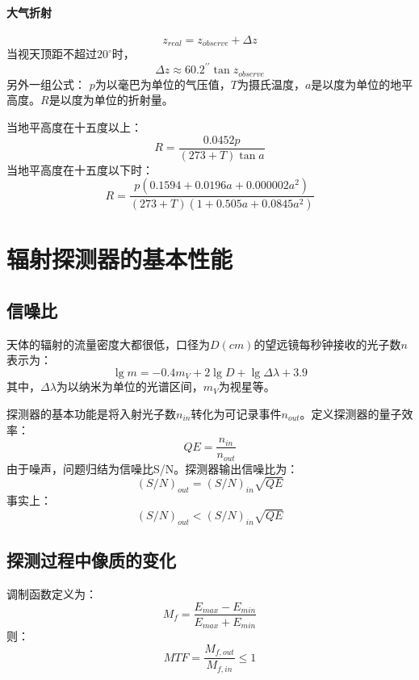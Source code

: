 \paragraph{大气折射}
\begin{equation}
	z_{real}=z_{observe}+\Delta z
\end{equation}
当视天顶距不超过$20^\circ$时，
\begin{equation}
	\Delta z\approx 60.2^{\prime\prime}\tan z_{observe}
\end{equation}
另外一组公式：
$p$为以毫巴为单位的气压值，$T$为摄氏温度，$a$是以度为单位的地平高度。$R$是以度为单位的折射量。

当地平高度在十五度以上：
\begin{equation}
	R=\frac{0.0452p}{(273+T)\tan a}
\end{equation}
当地平高度在十五度以下时：
\begin{equation}
	R=\frac{p(0.1594+0.0196a+0.000002a^2)}{(273+T)(1+0.505a+0.0845a^2)}
\end{equation}
\section{辐射探测器的基本性能}
\subsection{信噪比}
天体的辐射的流量密度大都很低，口径为$D(cm)$的望远镜每秒钟接收的光子数$n$表示为：
\begin{equation}
	\lg m=-0.4m_{V}+2\lg D+\lg \Delta\lambda+3.9
\end{equation}
其中，$\Delta\lambda$为以纳米为单位的光谱区间，$m_{V}$为视星等。

探测器的基本功能是将入射光子数$n_{in}$转化为可记录事件$n_{out}$。定义探测器的量子效率：
\begin{equation}
	QE=\frac{n_{in}}{n_{out}}
\end{equation}
由于噪声，问题归结为信噪比S/N。探测器输出信噪比为：
\begin{equation}
	(S/N)_{out}=(S/N)_{in}\sqrt{QE}
\end{equation}
事实上：
\begin{equation}
	(S/N)_{out}<(S/N)_{in}\sqrt{QE}
\end{equation}
\subsection{探测过程中像质的变化}调制函数定义为：
\begin{equation}
	M_{f}=\frac{E_{max}-E_{min}}{E_{max}+E_{min}}
\end{equation}
则：
\begin{equation}
	MTF=\frac{M_{f,out}}{M_{f,in}}\leq 1
\end{equation}
